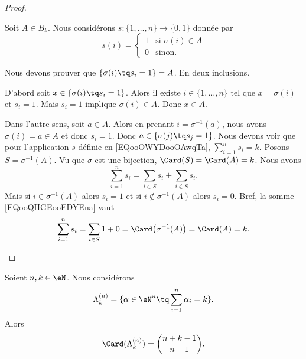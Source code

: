 \begin{proof}
\begin{subproof}
		Soit \( A\in B_k\). Nous considérons \(s \colon \{ 1,\ldots,n \}\to \{ 0,1 \}  \) donnée par
		\begin{equation}		\label{EQooOWYDooOAwqTa}
			s(i)=\begin{cases}
				1 & \text{si } \sigma(i)\in A \\
				0 & \text{sinon. }
			\end{cases}
		\end{equation}
		\begin{subproof}
			\spitem[\( \varphi(s)=A\)]
			Nous devons prouver que \( \{ \sigma(i)\tq s_i=1 \}=A\). En deux inclusions.

			D'abord soit \( x\in\{ \sigma(i)\tq s_i=1 \}\). Alors il existe \( i\in\{ 1,\ldots,n \}\) tel que \( x=\sigma(i)\) et \( s_i=1\). Mais \( s_i=1\) implique \( \sigma(i)\in A\). Donc \( x\in A\).

			Dans l'autre sens, soit \( a\in A\). Alors en prenant \( i=\sigma^{-1}(a)\), nous avons \( \sigma(i)=a\in A\) et donc \( s_i=1\). Donc \( a\in\{ \sigma(j)\tq s_j=1 \}\).
			\spitem[\( s\in C_k\)]
			Nous devons voir que pour l'application \( s\) définie en \eqref{EQooOWYDooOAwqTa}, \( \sum_{i=1}^ns_i=k\). Posons \( S=\sigma^{-1}(A)\). Vu que \( \sigma\) est une bijection, \( \Card(S)=\Card(A)=k\). Nous avons
			\begin{equation}		\label{EQooQHGEooEDYEna}
				\sum_{i=1}^ns_i=\sum_{i\in S}s_i+\sum_{i\not\in S} s_i.
			\end{equation}
			Mais si \( i\in\sigma^{-1}(A)\) alors \( s_i=1\) et si \( i\not\in \sigma^{-1}(A)\) alors \( s_i=0\). Bref, la somme \eqref{EQooQHGEooEDYEna} vaut
			\begin{equation}
				\sum_{i=1}^ns_i=\sum_{i\in S}1+0=\Card\big( \sigma^{-1}(A) \big)=\Card(A)=k.
			\end{equation}
		\end{subproof}
	\end{subproof}
\end{proof}

\begin{proposition}	\label{PROPooRBMVooIGkctj}
	Soient \( n,k\in \eN\). Nous considérons
	\begin{equation}	\label{EQooEHSRooUnhFsl}
		\Lambda_{k}^{(n)}=\{ \alpha\in \eN^n\tq\sum_{i=1}^n\alpha_i=k \}.
	\end{equation}
	Alors
	\begin{equation}
		\Card(\Lambda_k^{(n)})=\binom{ n+k-1 }{ n-1 }.
	\end{equation}
\end{proposition}


